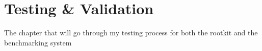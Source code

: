 \chapter{Testing \& Validation}

The chapter that will go through my testing process for both the rootkit and the benchmarking system